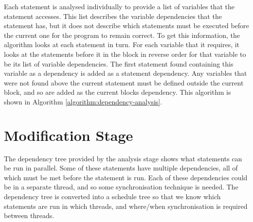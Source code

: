 Each statement is analysed individually to provide a list of variables that the statement accesses. This list describes the variable dependencies that the statement has, but it does not describe which statements must be executed before the current one for the program to remain correct. To get this information, the algorithm looks at each statement in turn. For each variable that it requires, it looks at the statements before it in the block in reverse order for that variable to be its list of variable dependencies. The first statement found containing this variable as a dependency is added as a statement dependency. Any variables that were not found above the current statement must be defined outside the current block, and so are added as the current blocks dependency. This algorithm is shown in Algorithm \autoref{algorithm:dependency-analysis}.


\section{Modification Stage}

The dependency tree provided by the analysis stage shows what statements can be run in parallel. Some of these statements have multiple dependencies, all of which must be met before the statement is run. Each of these dependencies could be in a separate thread, and so some synchronisation technique is needed. The dependency tree is converted into a schedule tree so that we know which statements are run in which threads, and where/when synchronisation is required between threads.

